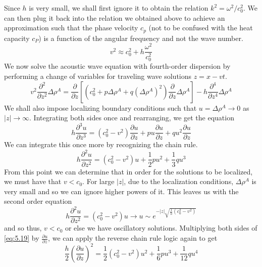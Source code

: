 \documentclass{article}
\newcommand{\pd}[2]{\frac{\partial #1}{\partial #2}}
\newcommand{\pdt}[2]{\frac{\partial ^2 #1}{\partial #2 ^2}}
\newcommand{\pdfo}[2]{\frac{\partial ^4 #1}{\partial #2^4}}
\numberwithin{equation}{section}
\begin{document}
Since $h$ is very small, we shall first ignore it to obtain the relation $k^2= \omega^2/c_0^2$. We can then plug it back into the relation we obtained above to achieve an approximation such that the phase velocity $c_p$ (not to be confused with the heat capacity $c_P$) is a function of the angular frequency and not the wave number.
\begin{equation}
    v^2 \approx c_0^2 + h\frac{\omega^2}{c_0^2}
\end{equation}
We now solve the acoustic wave equation with fourth-order dispersion by performing a change of variables for traveling wave solutions $z=x-vt$.
\begin{equation}
    v^2\pdt{}{z}\Delta \rho^A = \pd{}{z} \left[ (c_0^2 +p\Delta \rho^A + q(\Delta \rho^A)^2) \pd{}{z} \Delta \rho^A\right] - h \pdfo{}{z}\Delta \rho^A
\end{equation}
We shall also impose localizing boundary conditions such that $u=\Delta \rho^A \rightarrow 0$ as $|z| \rightarrow \infty$. Integrating both sides once and rearranging, we get the equation 
\begin{equation}
    h\frac{\partial^3 u}{\partial z^3}  = (c_0^2-v^2)\pd{u}{z} + pu \pd{u}{z}+qu^2\pd{u}{z}
\end{equation}
We can integrate this once more by recognizing the chain rule.
\begin{equation}
    h \pdt{u}{z} = (c_0^2-v^2)u + \frac{1}{2} pu^2+\frac{1}{3} qu^3 \label{eq:5.19}
\end{equation}
From this point we can determine that in order for the solutions to be localized, we must have that $v< c_0$. For large $|z|$, due to the localization conditions, $\Delta \rho^A $ is very small and so we can ignore higher powers of it. This leaves us with the second order equation 
\begin{equation*}
    h\pdt{u}{z} = (c_0^2-v^2)u \rightarrow u \sim e^{-|z|\sqrt{\frac{1}{h}(c_0^2-v^2)}}
\end{equation*}
and so thus, $v<c_0$ or else we have oscillatory solutions. Multiplying both sides of \eqref{eq:5.19} by $\pd{u}{z}$, we can apply the reverse chain rule logic again to get 
\begin{equation}
    \frac{h}{2} \left(\pd{u}{z} \right)^2 = \frac{1}{2}(c_0^2-v^2)u^2+\frac{1}{6}pu^3 + \frac{1}{12}qu^4 \label{eq:5.20}
\end{equation}
\end{document}
